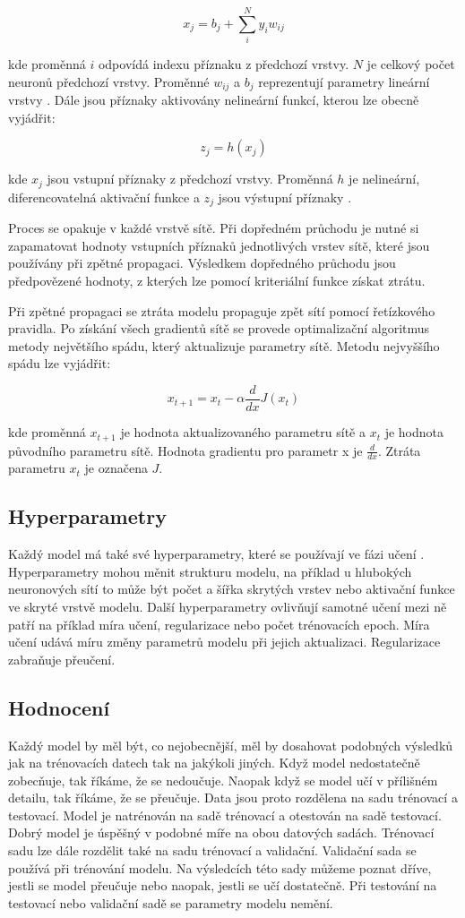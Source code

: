 \documentclass[FM,BP]{tulthesis}
\begin{document}
$$ x_j = b_j + \sum_{i}^{N} y_i w_{ij} $$

kde proměnná $ i $ odpovídá indexu příznaku z předchozí vrstvy. $ N $ je celkový počet neuronů předchozí vrstvy. Proměnné $ w_{ij} $ a $ b_j $ reprezentují parametry lineární vrstvy \cite{MATEJU2021327}. Dále jsou příznaky aktivovány nelineární funkcí, kterou lze obecně vyjádřit:

$$ z_j = h(x_j) $$

kde $ x_j $ jsou vstupní příznaky z předchozí vrstvy. Proměnná $ h $ je nelineární, diferencovatelná aktivační funkce a $ z_j $ jsou výstupní příznaky \cite{DBLP:books/lib/Bishop07}.

Proces se opakuje v každé vrstvě sítě. Při dopředném průchodu je nutné si zapamatovat hodnoty vstupních příznaků jednotlivých vrstev sítě, které jsou používány při zpětné propagaci. Výsledkem dopředného průchodu jsou předpovězené hodnoty, z kterých lze pomocí kriteriální funkce získat ztrátu.

Při zpětné propagaci se ztráta modelu propaguje zpět sítí pomocí řetízkového pravidla. Po získání všech gradientů sítě se provede optimalizační algoritmus metody největšího spádu, který aktualizuje parametry sítě. Metodu nejvyššího spádu lze vyjádřit:

$$ x_{t+1} = x_t - \alpha \frac{d}{dx}J(x_t) $$

kde proměnná $ x_{t+1} $ je hodnota aktualizovaného parametru sítě a $ x_t $ je hodnota původního parametru sítě. Hodnota gradientu pro parametr x je $ \frac{d}{dx} $. Ztráta parametru $ x_t $ je označena $ J $.

\subsection{Hyperparametry}
Každý model má také své hyperparametry, které se používají ve fázi učení \cite{leonel_2019}. Hyperparametry mohou měnit strukturu modelu, na příklad u hlubokých neuronových sítí to může být počet a šířka skrytých vrstev nebo aktivační funkce ve skryté vrstvě modelu. Další hyperparametry ovlivňují samotné učení mezi ně patří na příklad míra učení, regularizace nebo počet trénovacích epoch. Míra učení udává míru změny parametrů modelu při jejich aktualizaci. Regularizace zabraňuje přeučení.

\subsection{Hodnocení}
Každý model by měl být, co nejobecnější, měl by dosahovat podobných výsledků jak na trénovacích datech tak na jakýkoli jiných. Když model nedostatečně zobecňuje, tak říkáme, že se nedoučuje. Naopak když se model učí v přílišném detailu, tak říkáme, že se přeučuje. Data jsou proto rozdělena na sadu trénovací a testovací. Model je natrénován na sadě trénovací a otestován na sadě testovací. Dobrý model je úspěšný v podobné míře na obou datových sadách. Trénovací sadu lze dále rozdělit také na sadu trénovací a validační. Validační sada se používá při trénování modelu. Na výsledcích této sady můžeme poznat dříve, jestli se model přeučuje nebo naopak, jestli se učí dostatečně. Při testování na testovací nebo validační sadě se parametry modelu nemění.
\end{document}
